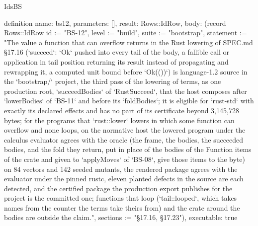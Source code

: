 \begin{lexlean}{IdsBS}
\begin{semanticmodule}
definition{
  name: bs12,
  parameters: [],
  result: Rows::IdRow,
  body: (record Rows::IdRow {id := "BS-12", level := "build", suite := "bootstrap", statement := "The value a function that can overflow returns in the Rust lowering of SPEC.md §17.16 (`succeed`: `Ok` pushed into every tail of the body, a fallible call or application in tail position returning its result instead of propagating and rewrapping it, a computed unit bound before `Ok(())`) is language-1.2 source in the `bootstrap/` project, the third pass of the lowering of terms, as one production root, `succeedBodies` of `RustSucceed`, that the host composes after `lowerBodies` of `BS-11` and before its `foldBodies`; it is eligible for `rust-std` with exactly its declared effects and has no part of its certificate beyond 3,145,728 bytes; for the programs that `rust::lower` lowers in which some function can overflow and none loops, on the normative host the lowered program under the calculus evaluator agrees with the oracle (the frame, the bodies, the succeeded bodies, and the fold they return, put in place of the bodies of the Function items of the crate and given to `applyMoves` of `BS-08`, give those items to the byte) on 84 vectors and 142 seeded mutants, the rendered package agrees with the evaluator under the pinned rustc, eleven planted defects in the source are each detected, and the certified package the production export publishes for the project is the committed one; functions that loop (`tail::looped`, which takes names from the counter the terms take theirs from) and the crate around the bodies are outside the claim.", sections := "§17.16, §17.23"}),
  executable: true
}


\end{semanticmodule}
\end{lexlean}
